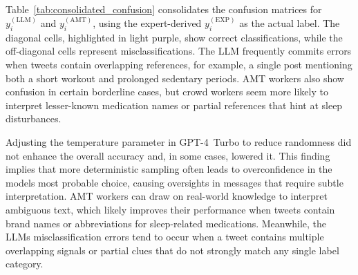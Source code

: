 \documentclass[letterpaper, 10 pt, conference]{ieeeconf} %
\begin{document}
Table~\ref{tab:consolidated_confusion} consolidates the confusion matrices for \(y_i^{(\mathrm{LLM})}\) and \(y_i^{(\mathrm{AMT})}\), using the expert-derived \(y_i^{(\mathrm{EXP})}\) as the actual label. The diagonal cells, highlighted in light purple, show correct classifications, while the off-diagonal cells represent misclassifications. The LLM frequently commits errors when tweets contain overlapping references, for example, a single post mentioning both a short workout and prolonged sedentary periods. AMT workers also show confusion in certain borderline cases, but crowd workers seem more likely to interpret lesser-known medication names or partial references that hint at sleep disturbances.


\begin{table*}[ht]
\centering
\caption{\footnotesize Confusion Matrices for \(y_i^{(\mathrm{LLM})}\) and \(y_i^{(\mathrm{AMT})}\), 
with \(y_i^{(\mathrm{EXP})}\) used as the actual label. 
Diagonal cells indicate correct predictions.}
\label{tab:consolidated_confusion}
\renewcommand{\arraystretch}{1.2}
 \vspace{-5mm}
\end{table*}


Adjusting the temperature parameter in GPT-4~Turbo to reduce randomness did not enhance the overall accuracy and, in some cases, lowered it. This finding implies that more deterministic sampling often leads to overconfidence in the model\textquotesingle{}s most probable choice, causing oversights in messages that require subtle interpretation. AMT workers can draw on real-world knowledge to interpret ambiguous text, which likely improves their performance when tweets contain brand names or abbreviations for sleep-related medications. Meanwhile, the LLM\textquotesingle{}s misclassification errors tend to occur when a tweet contains multiple overlapping signals or partial clues that do not strongly match any single label category.
\end{document}
